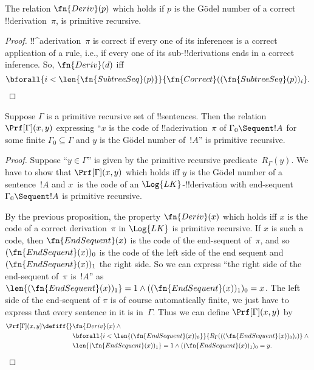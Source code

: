 \documentclass[../../../include/open-logic-section]{subfiles}
\begin{document}
\begin{prop}
  The relation $\fn{Deriv}(p)$ which holds if $p$ is the G\"odel
  number of a correct !!{derivation}~$\pi$, is primitive recursive.
\end{prop}

\begin{proof}
  !!^a{derivation}~$\pi$ is correct if every one of its inferences
  is a correct application of a rule, i.e., if every one of its
  sub-!!{derivation}s ends in a correct inference. So, $\fn{Deriv}(d)$
  iff
  \[
  \bforall{i<\len{\fn{SubtreeSeq}(p)}}{\fn{Correct}((\fn{SubtreeSeq}(p))_i}.
  \]
\end{proof}


\begin{prop}
Suppose $\Gamma$ is a primitive recursive set of !!{sentence}s.  Then
the relation $\Prf[\Gamma](x, y)$ expressing ``$x$ is the code of
!!a{derivation}~$\pi$ of $\Gamma_0 \Sequent !A$ for some finite
$\Gamma_0 \subseteq \Gamma$ and $y$ is the G\"odel number of~$!A$'' is
primitive recursive.
\end{prop}

\begin{proof}
Suppose ``$y \in \Gamma$'' is given by the primitive recursive
predicate~$R_\Gamma(y)$.  We have to show that $\Prf[\Gamma](x, y)$
which holds iff $y$ is the G\"odel number of a sentence~$!A$ and
$x$~is the code of an $\Log{LK}$-!!{derivation} with end-sequent
$\Gamma_0 \Sequent !A$ is primitive recursive.

By the previous proposition, the property $\fn{Deriv}(x)$ which holds
iff $x$ is the code of a correct derivation~$\pi$ in $\Log{LK}$ is
primitive recursive.  If $x$ is such a code, then $\fn{EndSequent}(x)$
is the code of the end-sequent of~$\pi$, and so
$(\fn{EndSequent}(x))_0$ is the code of the left side of the end
sequent and $(\fn{EndSequent}(x))_1$ the right side.  So we can
express ``the right side of the end-sequent of~$\pi$ is~$!A$'' as
$\len{(\fn{EndSequent}(x))_1} = 1 \land ((\fn{EndSequent}(x))_1)_0 =
x$.  The left side of the end-sequent of $\pi$ is of course
automatically finite, we just have to express that every sentence in
it is in~$\Gamma$.  Thus we can define $\Prf[\Gamma](x, y)$ by
\begin{align*}
\Prf[\Gamma](x, y) \defiff {}&
\fn{Deriv}(x) \land {} \\
& \bforall{i <
  \len{(\fn{EndSequent}(x))_0}}{R_\Gamma(((\fn{EndSequent}(x))_0)_i)} \land {}\\
& \len{(\fn{EndSequent}(x))_1} = 1 \land ((\fn{EndSequent}(x))_1)_0 = y.
\end{align*}
\end{proof}
\end{document}
